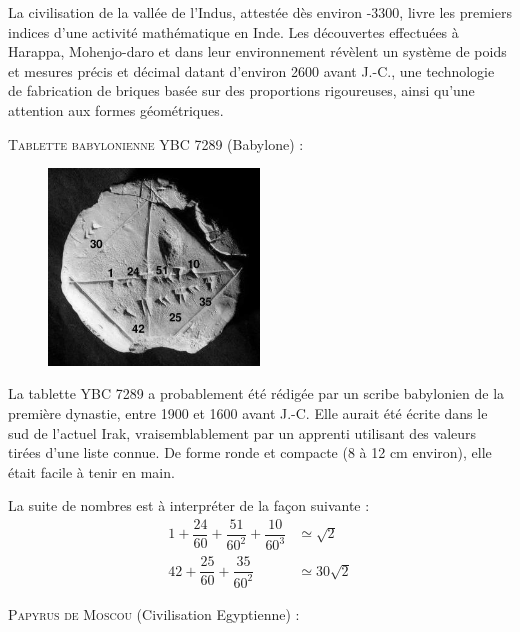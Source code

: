 La civilisation de la vallée de l'Indus, attestée dès environ -3300, livre les premiers indices d'une activité mathématique en Inde. Les découvertes effectuées à Harappa, Mohenjo-daro et dans leur environnement révèlent un système de poids et mesures précis et décimal datant d’environ 2600 avant J.-C., une technologie de fabrication de briques basée sur des proportions rigoureuses, ainsi qu’une attention aux formes géométriques.


\newpage


\textsc{Tablette babylonienne YBC 7289} (Babylone) : 

\vspace{.2cm}

\begin{figure} %
    \vspace{-0.65cm} %
    \includegraphics[width=0.5\textwidth]{../images/Ybc7289.jpg}
\end{figure}

La tablette YBC 7289 a probablement été rédigée par un scribe babylonien de la première dynastie, entre 1900 et 1600 avant J.-C. Elle aurait été écrite dans le sud de l’actuel Irak, vraisemblablement par un apprenti utilisant des valeurs tirées d’une liste connue. De forme ronde et compacte (8 à 12 cm environ), elle était facile à tenir en main. 

La suite de nombres est à interpréter de la façon suivante : 
\begin{align*}
1 + \dfrac{24}{60} + \dfrac{51}{60^2} + \dfrac{10}{60^3} &\simeq \sqrt{2}\\
42 + \dfrac{25}{60} + \dfrac{35}{60^2} &\simeq 30\sqrt{2}
\end{align*}

\newpage


\textsc{Papyrus de Moscou} (Civilisation Egyptienne) : 

